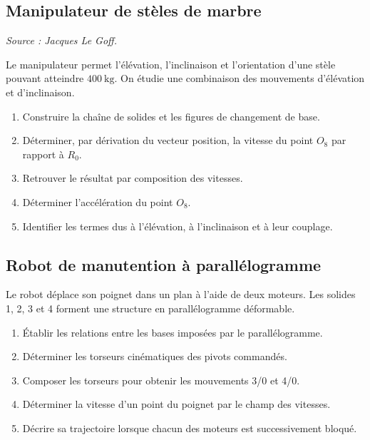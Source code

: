 
\subsection{Manipulateur de stèles de marbre}

\textit{Source : Jacques Le Goff.}

Le manipulateur permet l'élévation, l'inclinaison et l'orientation d'une
stèle pouvant atteindre $400\ \mathrm{kg}$. On étudie une combinaison
des mouvements d'élévation et d'inclinaison.

\begin{center}
\hfill
{}\hfill
{}
\end{center}

\begin{enumerate}
  \item Construire la chaîne de solides et les figures de changement de base.
  \item Déterminer, par dérivation du vecteur position, la vitesse du point $O_8$ par rapport à $R_0$.
  \item Retrouver le résultat par composition des vitesses.
  \item Déterminer l'accélération du point $O_8$.
  \item Identifier les termes dus à l'élévation, à l'inclinaison et à leur couplage.
\end{enumerate}

\subsection{Robot de manutention à parallélogramme}

Le robot déplace son poignet dans un plan à l'aide de deux moteurs. Les
solides 1, 2, 3 et 4 forment une structure en parallélogramme
déformable.

\begin{center}
\hfill
{}
\end{center}

\begin{enumerate}
  \item Établir les relations entre les bases imposées par le parallélogramme.
  \item Déterminer les torseurs cinématiques des pivots commandés.
  \item Composer les torseurs pour obtenir les mouvements 3/0 et 4/0.
  \item Déterminer la vitesse d'un point du poignet par le champ des vitesses.
  \item Décrire sa trajectoire lorsque chacun des moteurs est successivement bloqué.
\end{enumerate}

